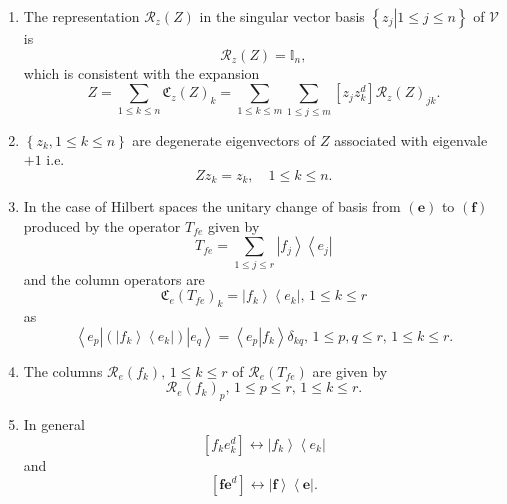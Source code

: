 \documentclass[aps,preprint]{revtex4}%
\begin{document}
\begin{enumerate}
\begin{enumerate}
\item The representation $\mathcal{R}_{z}\left(  Z\right)  $ in the singular
vector basis $\left\{  \left.  z_{j}\right\vert 1\leq j\leq n\right\}  $ of
$\mathcal{V}$ is
\begin{equation}
\mathcal{R}_{z}\left(  Z\right)  =\mathbb{I}_{n},
\end{equation}
which is consistent with the expansion
\begin{equation}
Z=\sum_{1\leq k\leq n}\mathfrak{C}_{z}\left(  Z\right)  _{k}=\sum_{1\leq k\leq
m}\sum_{1\leq j\leq m}\left[  z_{j}z_{k}^{d}\right]  \mathcal{R}_{z}\left(
Z\right)  _{jk}.
\end{equation}


\item $\left\{  z_{k},1\leq k\leq n\right\}  $ are degenerate eigenvectors of
$Z$ associated with eigenvale $+1$ i.e.
\begin{equation}
Zz_{k}=z_{k},\quad1\leq k\leq n.
\end{equation}


\item In the case of Hilbert spaces the unitary change of basis from $\left(
\mathbf{e}\right)  $ to $\left(  \mathbf{f}\right)  $ produced by the operator
$T_{fe}$ given by
\begin{equation}
T_{fe}=\sum_{1\leq j\leq r}\left\vert f_{j}\right\rangle \left\langle
e_{j}\right\vert
\end{equation}
and the column operators are
\begin{equation}
\mathfrak{C}_{e}\left(  T_{fe}\right)  _{k}=\left\vert f_{k}\right\rangle
\left\langle e_{k}\right\vert ,\,1\leq k\leq r
\end{equation}
as
\begin{equation}
\left\langle e_{p}\right\vert \left(  \left\vert f_{k}\right\rangle
\left\langle e_{k}\right\vert \right)  \left\vert e_{q}\right\rangle
=\left\langle \left.  e_{p}\right\vert f_{k}\right\rangle \delta_{kq},\,1\leq
p,q\leq r,\,1\leq k\leq r.
\end{equation}


\item The columns $\mathcal{R}_{e}\left(  f_{k}\right)  ,\,1\leq k\leq r$ of
$\mathcal{R}_{e}\left(  T_{fe}\right)  $ are given by
\begin{equation}
\mathcal{R}_{e}\left(  f_{k}\right)  _{p},\,1\leq p\leq r,\,1\leq k\leq r.
\end{equation}


\item In general
\begin{equation}
\left[  f_{k}e_{k}^{d}\right]  \leftrightarrow\left\vert f_{k}\right\rangle
\left\langle e_{k}\right\vert
\end{equation}
and
\begin{equation}
\left[  \mathbf{fe}^{d}\right]  \leftrightarrow\left\vert \mathbf{f}%
\right\rangle \left\langle \mathbf{e}\right\vert .
\end{equation}

\end{enumerate}
\end{enumerate}
\end{document}
